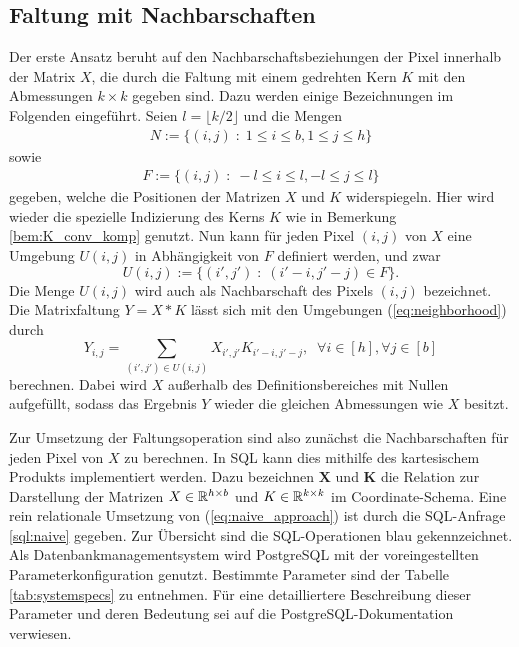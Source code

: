 \subsection{Faltung mit Nachbarschaften}
\label{abs:naive_app}
Der erste Ansatz beruht auf den Nachbarschaftsbeziehungen der Pixel innerhalb der Matrix $X$, die durch die Faltung mit einem gedrehten Kern $K$ mit den Abmessungen $k \times k$ gegeben sind. Dazu werden einige Bezeichnungen im Folgenden eingeführt. Seien $l=\lfloor k/2 \rfloor$ und die Mengen
\begin{align*}
    N:=\{(i,j) \; :\; 1 \leq i \leq b, 1 \leq j \leq h \}
\end{align*} 
sowie
\begin{align*}
    F:=\{(i,j) \; :\; -l \leq i \leq l, -l \leq j \leq l \}
\end{align*} 
gegeben, welche die Positionen der Matrizen $X$ und $K$ widerspiegeln. Hier wird wieder die spezielle Indizierung des Kerns $K$ wie in Bemerkung \ref{bem:K_conv_komp} genutzt. Nun kann für jeden Pixel $(i,j)$ von $X$ eine Umgebung $U(i,j)$  in Abhängigkeit von $F$ definiert werden, und zwar
\begin{equation}
    \label{eq:neighborhood}
    U(i,j):=\{(i', j') \; : \; (i'-i, j'-j) \in F \}.
\end{equation}
Die Menge $U(i,j)$ wird auch als Nachbarschaft des Pixels $(i,j)$ bezeichnet.
Die Matrixfaltung $Y= X \ast K$ lässt sich mit den Umgebungen (\ref{eq:neighborhood}) durch
\begin{equation}
    \label{eq:naive_approach}
    Y_{i,j}=\sum_{(i',j') \in U(i,j)} X_{i', j'} K_{i'-i, j'-j}, \; \; \forall i \in [h], \forall j \in [b]
\end{equation}
berechnen. Dabei wird $X$ außerhalb des Definitionsbereiches mit Nullen aufgefüllt, sodass das Ergebnis $Y$ wieder die gleichen Abmessungen wie $X$ besitzt.

Zur Umsetzung der Faltungsoperation sind also zunächst die Nachbarschaften für jeden Pixel von $X$ zu berechnen. In SQL kann dies mithilfe des kartesischem Produkts implementiert werden. Dazu bezeichnen $\mathbf{X}$ und $\mathbf{K}$ die Relation zur Darstellung der Matrizen $X \in \mathbb{R}^{h \times b}$ und $K \in \mathbb{R}^{k \times k}$ im Coordinate-Schema. Eine rein relationale Umsetzung von (\ref{eq:naive_approach}) ist durch die SQL-Anfrage \ref{sql:naive} gegeben. Zur Übersicht sind die SQL-Operationen blau gekennzeichnet. Als Datenbankmanagementsystem wird PostgreSQL mit der voreingestellten Parameterkonfiguration genutzt. Bestimmte Parameter sind der Tabelle \ref{tab:systemspecs} zu entnehmen. Für eine detailliertere Beschreibung dieser Parameter und deren Bedeutung sei auf die PostgreSQL-Dokumentation verwiesen.

